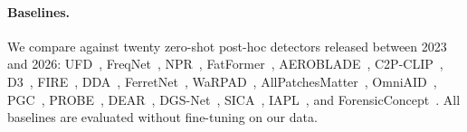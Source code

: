 \paragraph{Baselines.}
We compare against twenty zero-shot post-hoc detectors released between 2023 and 2026:
UFD~\cite{ufd},
FreqNet~\cite{freqnet}, NPR~\cite{npr}, FatFormer~\cite{fatformer}, AEROBLADE~\cite{aeroblade},
C2P-CLIP~\cite{c2pclip}, D3~\cite{d3}, FIRE~\cite{fire}, DDA~\cite{dda}, FerretNet~\cite{ferretnet}, WaRPAD~\cite{warpad},
AllPatchesMatter~\cite{allpatchesmatter}, OmniAID~\cite{omniaid}, PGC~\cite{pgc}, PROBE~\cite{probe}, DEAR~\cite{dear}, DGS-Net~\cite{dgsnet}, SICA~\cite{sica}, IAPL~\cite{iapl}, and ForensicConcept~\cite{forensicconcept}.
All baselines are evaluated without fine-tuning on our data.
